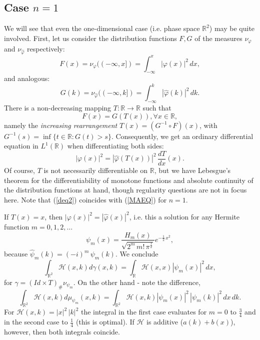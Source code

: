 \documentclass[12pt,a4paper]{article}
\newcommand{\RR}[1]{\mathbb{R}^#1}
\newcommand{\HH}{\mathcal{H}}
\begin{document}
%
\subsection{Case $n=1$}
We will see that even the one-dimensional case (i.e. phase space $\RR 2$) may
be quite involved. First, let us consider the distribution functions $F,G$ of 
the measures $\nu_\varphi$ and $\nu_{\hat\varphi}$ respectively:
\begin{equation*}
    F(x)=\nu_{\varphi}((-\infty,x])=\int_{- \infty}^{x} |\varphi(x)|^2\,dx,
\end{equation*}
and analogous:
\begin{equation*}
    G(k)=\nu_{\hat\varphi}((-\infty,k])=\int_{- \infty}^{k} |\hat\varphi(k)|^2\,dk.
\end{equation*}
There is a non-decreasing mapping $T:\mathbb{R}\rightarrow\mathbb{R}$ such that
\begin{equation}
     F(x) = G(T(x)),\forall x\in \mathbb{R},
\end{equation}
namely the {\sl increasing rearrangement} $T(x)=(G^{-1}\circ F)(x)$, with 
$G^{-1}(s)=\inf\{t\in\mathbb{R}: G(t)>s\}$.
Consequently, we get an ordinary differential equation in $L^1(\mathbb{R})$ when differentiating both sides:
\begin{equation}\label{deq2}
      |\varphi(x)|^2 = |\hat\varphi(T(x))|^2 \, \frac{dT}{dx}(x).
\end{equation}
Of course, $T$ is not necessarily differentiable on $\mathbb{R}$, but we have
Lebesgue's theorem for the differentiability of monotone functions and
absolute continuity of the distribution functions at hand, though regularity
questions are not in focus here. Note that (\ref{deq2}) coincides with (\ref{MAEQ}) 
for $n=1$.

If $T(x)=x$, then  $|\varphi(x)|^2 = |\hat\varphi(x)|^2$, i.e. this a solution
for any Hermite function $m=0,1,2,\ldots$
\begin{equation}
    \psi_m(x) = \frac{H_m(x)}{\sqrt{2^m\,m!\,\pi^\frac{1}{2}}} e^{-\frac{1}{2}\,x^2},
\end{equation}
because $\hat\psi_m(k)=(-i)^m\,\psi_m(k)$. We conclude 
\begin{displaymath}
   \int_{\RR 2} \HH(x,k) d\gamma(x,k) = \int_{\mathbb{R}} \HH(x,x) |\psi_m(x)|^2\,dx, 
\end{displaymath}
for $\gamma=(Id\times T)_\#\nu_{\psi_m}$. On the other hand - note the difference, 
\begin{displaymath}
    \int_{\RR 2} \HH(x,k) d\mu_{\psi_m}(x,k) = \int_{\RR 2} \HH(x,k) |\psi_m(x)|^2\,
    |\psi_m(k)|^2 \,dx\,dk.
\end{displaymath}
For $\HH(x,k)=|x|^2\,|k|^2$ the integral in the first case evaluates for $m=0$
to $\frac{3}{4}$ and in the second case to $\frac{1}{4}$ (this is optimal). If
$\HH$ is additive ($a(k)+b(x)$), however, then both integrals coincide. 
\end{document}
